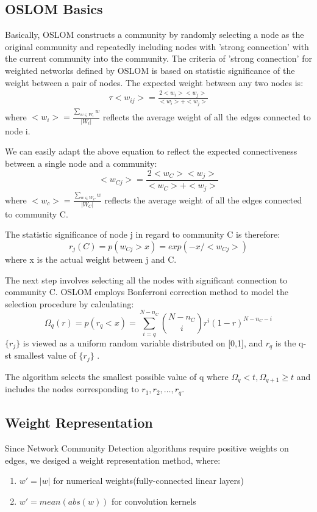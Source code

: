 \documentclass{acmtog} %
\begin{document}
\subsection*{OSLOM Basics}
Basically, OSLOM constructs a community by randomly selecting a node as the original community and repeatedly including nodes with 'strong connection' with the current community into the community.
The criteria of 'strong connection' for weighted networks defined by OSLOM is based on statistic significance of the weight between a pair of nodes. The expected weight between any two nodes is:
\begin{eqnarray}
  \tau	<w_{ij}>=\frac{2<w_{i}><w_{j}>}{<w_{i}>+<w_{j}>}
  \label{eq:Link_n_Stark}
\end{eqnarray}
where $<w_{i}>=\frac{\sum_{w\in W_{i}}w}{|W_{i}|}$ reflects the average weight of all the edges connected to node i.

We can easily adapt the above equation to reflect the expected connectiveness between a single node and a community:
\begin{equation}
\label{eq:moon}
 <w_{Cj}>=\frac{2<w_{C}><w_{j}>}{<w_{C}>+<w_{j}>}
\end{equation}
where $<w_{c}>=\frac{\sum_{w\in W_{C}}w}{|W_{C}|}$ reflects the average weight of all the edges connected to community C.

The statistic significance of node j in regard to community C is therefore:
\begin{equation}
 r_{j}(C )=p(w_{Cj}>x)=exp(-x/<w_{Cj}>)
\end{equation}
where x is the actual weight between j and C.

The next step involves selecting all the nodes with significant connection to community C. OSLOM employs Bonferroni correction method to model the selection procedure by calculating:
\begin{equation}
	\Omega_{q}(r)=p(r_{q}<x)=\sum_{i=q}^{N-n_{C}}\binom{N-n_{C}}{i}r^i(1-r)^{N-n_{C}-i}
\end{equation}
$\{r_{j}\}$ is viewed as a uniform random variable distributed on [0,1], and $r_{q}$ is the q-st smallest value of $\{r_{j}\}$ .

The algorithm selects the smallest possible value of q where $\Omega_{q}<t, \Omega_{q+1}\geq t$ and includes the nodes corresponding to $r_{1}, r_{2}, …, r_{q}$.
\subsection*{Weight Representation}
%
Since Network Community Detection algorithms require positive weights on edges, we desiged a weight representation method, where:
\begin{enumerate}
	\item $w'=|w|$ for numerical weights(fully-connected linear layers)\\
    \item $w'=mean(abs(w))$ for convolution kernels
\end{enumerate}
\end{document}
